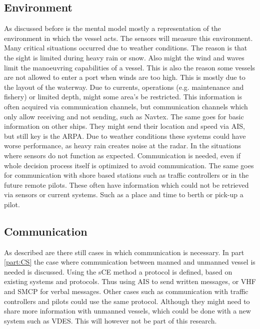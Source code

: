 \subsection{Environment}
As discussed before is the mental model mostly a representation of the environment in which the vessel acts. The sensors will measure this environment. Many critical situations occurred due to weather conditions. The reason is that the sight is limited during heavy rain or snow. Also might the wind and waves limit the manoeuvring capabilities of a vessel. This is also the reason some vessels are not allowed to enter a port when winds are too high.
This is mostly due to the layout of the waterway. Due to currents, operations (e.g. maintenance and fishery) or limited depth, might some area's be restricted. This information is often acquired via communication channels, but communication channels which only allow receiving and not sending, such as \acf{Navtex}.
The same goes for basic information on other ships. They might send their location and speed via \ac{AIS}, but still key is the \ac{ARPA}. Due to weather conditions these systems could have worse performance, as heavy rain creates noise at the radar. In the situations where sensors do not function as expected. Communication is needed, even if whole decision process itself is optimized to avoid communication.
The same goes for communication with shore based stations such as traffic controllers or in the future remote pilots. These often have information which could not be retrieved via sensors or current systems. Such as a place and time to berth or pick-up a pilot.

\subsection{Communication}
As described are there still cases in which communication is necessary. In part \ref{part:CS} the case where communication between manned and unmanned vessel is needed is discussed. Using the \acf{sCE} method a protocol is defined, based on existing systems and protocols. Thus using \ac{AIS} to send written messages, or \ac{VHF} and \ac{SMCP} for verbal messages. 
Other cases such as communication with traffic controllers and pilots could use the same protocol. Although they might need to share more information with unmanned vessels, which could be done with a new system such as \ac{VDES}. This will however not be part of this research.
